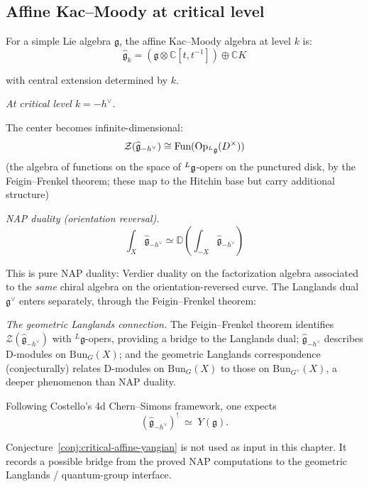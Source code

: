 \subsection{Affine Kac--Moody at critical level}

\begin{example}\label{ex:kac-moody-NAP}
For a simple Lie algebra $\mathfrak{g}$, the affine Kac--Moody algebra at level $k$ is:
\[\widehat{\mathfrak{g}}_k = (\mathfrak{g} \otimes \mathbb{C}[t, t^{-1}]) \oplus \mathbb{C} K\]

with central extension determined by $k$.

\emph{At critical level $k = -h^\vee$.}

The center becomes infinite-dimensional:
\[\mathcal{Z}(\widehat{\mathfrak{g}}_{-h^\vee}) \cong \text{Fun}(\text{Op}_{{}^L\mathfrak{g}}(D^\times))\]
(the algebra of functions on the space of ${}^L\mathfrak{g}$-opers on the punctured disk, by the Feigin--Frenkel theorem; these map to the Hitchin base but carry additional structure)

\emph{NAP duality (orientation reversal).}
\[\int_X \widehat{\mathfrak{g}}_{-h^\vee} \simeq \mathbb{D}\left(\int_{-X} \widehat{\mathfrak{g}}_{-h^{\vee}}\right)\]

This is pure NAP duality: Verdier duality on the factorization algebra associated to the \emph{same} chiral algebra on the orientation-reversed curve.  The Langlands dual $\mathfrak{g}^\vee$ enters separately, through the Feigin--Frenkel theorem:

\emph{The geometric Langlands connection.}
The Feigin--Frenkel theorem identifies $\mathcal{Z}(\widehat{\mathfrak{g}}_{-h^\vee})$ with ${}^L\mathfrak{g}$-opers, providing a bridge to the Langlands dual; $\widehat{\mathfrak{g}}_{-h^\vee}$ describes D-modules on $\text{Bun}_G(X)$; and the geometric Langlands correspondence (conjecturally) relates D-modules on $\text{Bun}_G(X)$ to those on $\text{Bun}_{G^\vee}(X)$, a deeper phenomenon than NAP duality.

\begin{conjecture}\label{conj:critical-affine-yangian}
Following Costello's 4d Chern--Simons framework, one expects
\[
(\widehat{\mathfrak{g}}_{-h^\vee})^! \;\simeq\; Y(\mathfrak{g}).
\]
\end{conjecture}

\begin{remark}[Scope]
Conjecture~\ref{conj:critical-affine-yangian} is not used as input in
this chapter.  It records a possible bridge from the proved NAP
computations to the geometric Langlands / quantum-group interface.
\end{remark}
\end{example}

